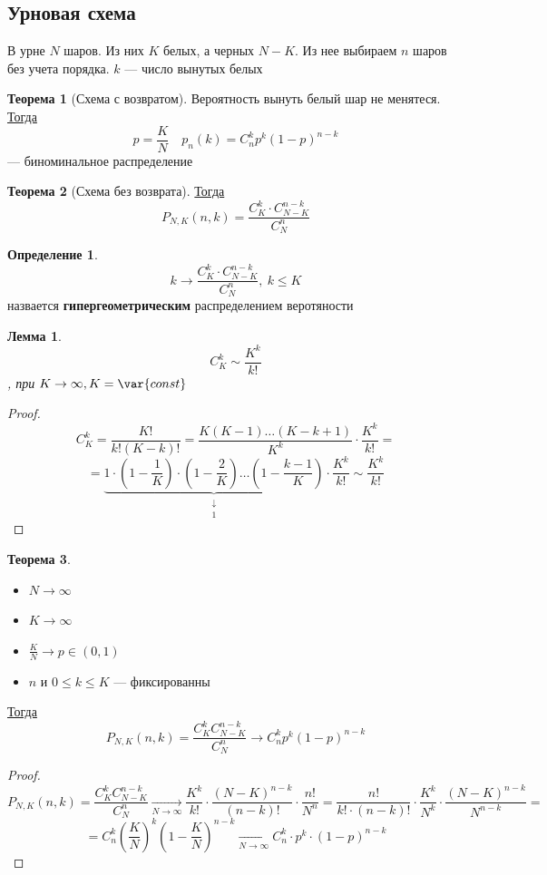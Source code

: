 \documentclass[oneside]{book}
\newcommand{\const}{\var{const}}
\theoremstyle{plain}
\newtheorem{lemma}{Лемма}
\theoremstyle{remark}
\theoremstyle{definition}
\newtheorem{theorem}{Теорема}[section]
\newtheorem*{definition}{Определение}
\begin{document}
\subsection{Урновая схема}
\label{sec:org888bffb}
В урне \(N\) шаров. Из них \(K\) белых, а черных \(N - K\). Из нее выбираем \(n\) шаров без учета порядка. \(k\) --- число вынутых белых
\begin{theorem}[Схема с возвратом]
Вероятность вынуть белый шар не менятеся. \\
\uline{Тогда} \[ p = \frac{K}{N}\quad p_n(k) = C^k_np^k(1 - p)^{n - k} \]
--- биноминальное распределение
\end{theorem}
\begin{theorem}[Схема без возврата]
\uline{Тогда} \[ P_{N,K}(n, k) = \frac{C^k_K\cdot C^{n-k}_{N - K}}{C^n_N} \]
\end{theorem}
\begin{definition}
\[ k \to \frac{C^k_K\cdot C^{n - k}_{N - K}}{C^n_N},\ k \le K \]
назвается \textbf{гипергеометрическим} распределением веротяности
\end{definition}
\begin{lemma}
\[ C^k_K \sim \frac{K^k}{k!} \]
, при \(K \to \infty, K = \const\)
\end{lemma}
\begin{proof}
\[ C^k_K = \frac{K!}{k!(K - k)!} = \frac{K(K - 1)\dots(K - k + 1)}{K^k}\cdot \frac{K^k}{k!} = \]
\[ = \underbrace{1 \cdot \left(1 - \frac{1}{K}\right)\cdot\left(1 - \frac{2}{K}\right) \dots \left(1 - \frac{k - 1}{K}\right)}_{\substack{\downarrow \\ 1}} \cdot\frac{K^k}{k!} \sim \frac{K^k}{k!}\]
\end{proof}
\begin{theorem}
\-
\begin{itemize}
\item \(N \to \infty\)
\item \(K \to \infty\)
\item \(\frac{K}{N} \to p \in (0, 1)\)
\item \(n\) и \(0 \le k \le K\) --- фиксированны
\end{itemize}
\uline{Тогда} \[ P_{N,K}(n,k) = \frac{C^k_KC^{n - k}_{N - K}}{C^n_N} \to C^k_np^k(1 - p)^{n - k} \]
\end{theorem}
\begin{proof}
\[ P_{N, K}(n, k) = \frac{C^k_KC^{n - k}_{N - K}}{C^n_N} \xrightarrow[N \to \infty]{} \frac{K^k}{k!}\cdot \frac{(N -K)^{n - k}}{(n - k)!}\cdot \frac{n!}{N^n} = \frac{n!}{k!\cdot(n- k)!}\cdot \frac{K^k}{N^k}\cdot\frac{(N - K)^{n - k}}{N^{n - k}} = \]
\[ = C^k_n\left(\frac{K}{N}\right)^k\left(1 - \frac{K}{N}\right)^{n -k} \xrightarrow[N \to \infty]{} C^k_n\cdot p^k \cdot ( 1- p)^{n - k}\]
\end{proof}
\end{document}
